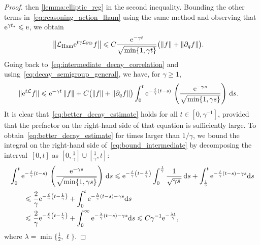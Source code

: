 \documentclass[11pt,a4paper]{article}
\begin{document}
\begin{proof}
    then \eqref{lemma:elliptic_reg} in the second inequality.
    Bounding the other terms in~\eqref{eq:reasoning_action_lham} using the same method
    and observing that~$\mathrm{e}^{\gamma t_*} \leqslant \mathrm{e}$,
    we obtain
    \begin{align}
        \label{eq:bound_action_lham}
        \norm{\mathcal L_{\rm Ham} \e^{t \gamma \mathcal L_{\rm FD}} f}
        &\leq C  \frac{\e^{-\gamma t}}{\sqrt{\min\{1, \gamma t\}}}  \bigl( \norm{f} + \norm{\partial_q f} \bigr).
    \end{align}
    Going back to~\eqref{eq:intermediate_decay_correlation} and using~\eqref{eq:decay_semigroup_general},
    we have, for $\gamma \geq 1$,
    \begin{align}
        \label{eq:bound_intermediate}
        \norm*{ \e^{t \mathcal L} f}
        &\leq  \e^{-\gamma t} \norm{f}
        + C  \bigl( \norm{f} + \norm{\partial_q f}\bigr) \int_{0}^{t} \e^{-\frac{\ell}{\gamma}(t-s)}  \, \left(\frac{\e^{-\gamma s}}{\sqrt{\min\{1, \gamma s\}}}\right) \, \d s.
    \end{align}
    It is clear that~\eqref{eq:better_decay_estimate} holds for all $t \in [0, \gamma^{-1}]$,
    provided that the prefactor on the right-hand side of that equation is sufficiently large.
    To obtain~\eqref{eq:better_decay_estimate} for times larger than $1/\gamma$,
    we bound the integral on the right-hand side of~\eqref{eq:bound_intermediate} by decomposing the interval~$[0, t]$ as $[0, \frac{1}{\gamma}] \cup [\frac{1}{\gamma}, t]$:
    \begin{align}
        \notag
        &\int_{0}^{t} \mathrm{e}^{-\frac{\ell}{\gamma}(t-s)}  \, \left( \frac{\mathrm{e}^{-\gamma s}}{\sqrt{\min\{1, \gamma s\}}} \right) \, \mathrm d s
        \leqslant
        \mathrm{e}^{-\frac{\ell}{\gamma} \left(t-\frac{1}{\gamma}\right)}
         \int_{0}^{\frac{1}{\gamma}}  \frac{1}{\sqrt{\gamma s\, }} \, \mathrm d s
         + \int_{\frac{1}{\gamma}}^{t} \mathrm{e}^{-\frac{\ell}{\gamma}(t-s) - \gamma s} \mathrm d s \\
         \notag
        &\qquad \leqslant
        \frac{2}{\gamma}\mathrm{e}^{-\frac{\ell}{\gamma} \left(t-\frac{1}{\gamma}\right)}
         + \int_{0}^{t} \mathrm{e}^{-\frac{\lambda}{\gamma}(t-s) - \gamma s} \mathrm d s \\
         \label{eq:bound_integral}
        &\qquad \leqslant
        \frac{2}{\gamma}\mathrm{e}^{-\frac{\ell}{\gamma} \left(t-\frac{1}{\gamma}\right)}
         + \int_{0}^{\infty} \mathrm{e}^{-\frac{\lambda}{\gamma}(t-s) - \gamma s} \mathrm d s
        \leqslant C  \gamma^{-1} \mathrm{e}^{-\frac{\lambda t}{\gamma}},
    \end{align}
    where $\lambda = \min \{\frac{1}{2}, \ell \}$.

\end{proof}
\end{document}
